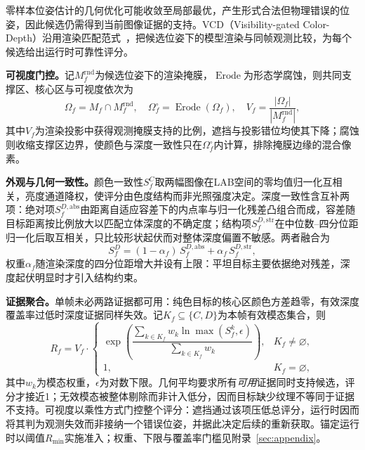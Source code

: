 \documentclass[review]{vgtc}
\begin{document}
零样本位姿估计的几何优化可能收敛至局部最优，产生形式合法但物理错误的位姿，因此候选仍需得到当前图像证据的支持。VCD（Visibility-gated Color-Depth）沿用渲染匹配范式~\cite{cosypose2020,megapose2022}，把候选位姿下的模型渲染与同帧观测比较，为每个候选给出运行时可靠性评分。

\textbf{可视度门控。}记$M_f^{\mathrm{rnd}}$为候选位姿下的渲染掩膜，$\operatorname{Erode}$为形态学腐蚀，则共同支撑区、核心区与可视度依次为
\begin{equation}
\Omega_f = M_f \cap M_f^{\mathrm{rnd}}, \quad \Omega_f^{\circ} = \operatorname{Erode}(\Omega_f), \quad V_f = \frac{|\Omega_f|}{|M_f^{\mathrm{rnd}}|},
\label{eq:visibility}
\end{equation}
其中$V_f$为渲染投影中获得观测掩膜支持的比例，遮挡与投影错位均使其下降；腐蚀则收缩支撑区边界，使颜色与深度一致性只在$\Omega_f^{\circ}$内计算，排除掩膜边缘的混合像素。

\textbf{外观与几何一致性。}颜色一致性$S_f^C$取两幅图像在LAB空间的零均值归一化互相关，亮度通道降权，使评分由色度结构而非光照强度决定。深度一致性含互补两项：绝对项$S_f^{D,\mathrm{abs}}$由距离自适应容差下的内点率与归一化残差凸组合而成，容差随目标距离按比例放大以匹配立体深度的不确定度；结构项$S_f^{D,\mathrm{str}}$在中位数--四分位距归一化后取互相关，只比较形状起伏而对整体深度偏置不敏感。两者融合为
\begin{equation}
S_f^D = (1-\alpha_f)\,S_f^{D,\mathrm{abs}} + \alpha_f\,S_f^{D,\mathrm{str}},
\label{eq:depth-score}
\end{equation}
权重$\alpha_f$随渲染深度的四分位距增大并设有上限：平坦目标主要依据绝对残差，深度起伏明显时才引入结构约束。

\textbf{证据聚合。}单帧未必两路证据都可用：纯色目标的核心区颜色方差趋零，有效深度覆盖率过低时深度证据同样失效。记$K_f \subseteq \{C, D\}$为本帧有效模态集合，则
\begin{equation}
R_f = V_f \cdot
\begin{cases}
\exp\!\left(\dfrac{\sum_{k \in K_f} w_k \ln \max(S_f^{k}, \epsilon)}{\sum_{k \in K_f} w_k}\right), & K_f \neq \varnothing, \\[6pt]
1, & K_f = \varnothing,
\end{cases}
\label{eq:vcd}
\end{equation}
其中$w_k$为模态权重，$\epsilon$为对数下限。几何平均要求所有\emph{可用}证据同时支持候选，评分才接近1；无效模态被整体剔除而非计入低分，因而目标缺少纹理不等同于证据不支持。可视度以乘性方式门控整个评分：遮挡通过该项压低总评分，运行时因而将其判为观测失效而非接纳一个错误位姿，并据此决定后续的重新获取。锚定运行时以阈值$R_{\min}$实施准入；权重、下限与覆盖率门槛见附录~\ref{sec:appendix}。
\end{document}
